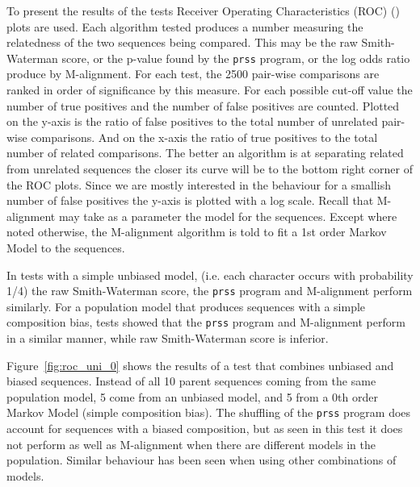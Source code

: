 \documentclass[a4paper,11pt,oneside]{article}
\begin{document}
To present the results of the tests Receiver Operating Characteristics (ROC)
(\cite{gribskov96, brenner98}) plots are used.  Each algorithm tested produces
a number measuring the relatedness of the two sequences being compared.  This
may be the raw Smith-Waterman score, or the p-value found by the \verb!prss! 
program, or the log odds ratio produce by M-alignment.  For each test, the
2500 pair-wise comparisons are ranked in order of significance by this
measure.  For each possible cut-off value the number of true positives and the
number of false positives are counted.  Plotted on the y-axis is the ratio of
false positives to the total number of unrelated pair-wise comparisons.  And
on the x-axis the ratio of true positives to the total number of related
comparisons.  The better an algorithm is at separating related from unrelated
sequences the closer its curve will be to the bottom right corner of the ROC
plots.  Since we are mostly interested in the behaviour for a smallish number
of false positives the y-axis is plotted with a log scale.  Recall that
M-alignment may take as a parameter the model for the sequences.  Except where
noted otherwise, the M-alignment algorithm is told to fit a 1st order Markov
Model to the sequences.

In tests with a simple unbiased model, (i.e. each character occurs with
probability 1/4) the raw Smith-Waterman score, the \verb!prss! program and
M-alignment perform similarly.  For a population model that produces sequences
with a simple composition bias, tests showed that the \verb!prss! program and
M-alignment perform in a similar manner, while raw Smith-Waterman score is
inferior.

Figure~\ref{fig:roc_uni_0} shows the results of a test that combines unbiased
and biased sequences.  Instead of all 10 parent sequences coming from the same
population model, 5 come from an unbiased model, and 5 from a 0th order Markov
Model (simple composition bias).  The shuffling of the \verb!prss! program
does account for sequences with a biased composition, but as seen in this test
it does not perform as well as M-alignment when there are different models in
the population.  Similar behaviour has been seen when using other combinations
of models.

\end{document}
